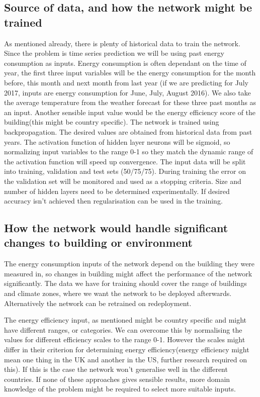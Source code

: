 \documentclass[a4paper, 11pt]{article}
\begin{document}
\subsection{Source of data, and how the network might be trained}
As mentioned already, there is plenty of historical data to train the network. Since the problem is time series prediction we will be using past energy consumption as inputs. Energy consumption is often dependant on the time of year, the first three input variables will be the energy consumption for the month before, this month and next month from last year (if we are predicting for July 2017, inputs are energy consumption for June, July, August 2016). We also take the average temperature from the weather forecast for these three past months as an input. Another sensible input value would be the energy efficiency score of the building(this might be country specific).
The network is trained using backpropagation. The desired values are obtained from historical data from past years. The activation function of hidden layer neurons will be sigmoid, so normalizing input variables to the range 0-1 so they match the dynamic range of the activation function will speed up convergence. The input data will be split into training, validation and test sets (50/75/75). During training the error on the validation set will be monitored and used as a stopping criteria. Size and number of hidden layers need to be determined experimentally. If desired accuracy isn't achieved then regularisation can be used in the training. 
\subsection{How the network would handle significant changes to building or environment}
The energy consumption inputs of the network depend on the building they were measured in, so changes in building might affect the performance of the network significantly. The data we have for training should cover the range of buildings and climate zones, where we want the network to be deployed afterwards. Alternatively the network can be retrained on redeployment. 

The energy efficiency input, as mentioned might be country specific and might have different ranges, or categories. We can overcome this by normalising the values for different efficiency scales to the range 0-1. However the scales might differ in their criterion for determining energy efficiency(energy efficiency might mean one thing in the UK and another in the US, further research required on this). If this is the case the network won't generalise well in the different countries. If none of these approaches gives sensible results, more domain knowledge of the problem might be required to select more suitable inputs. 
\end{document}
